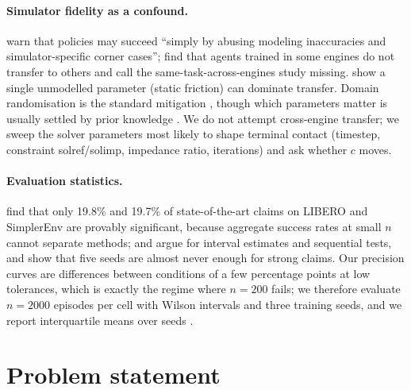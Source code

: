 \documentclass{article}
\begin{document}
\paragraph{Simulator fidelity as a confound.}
\citet{aljalbout2025reality} warn that policies may succeed ``simply by abusing modeling inaccuracies and simulator-specific corner cases''; \citet{kaup2024review} find that agents trained in some engines do not transfer to others and call the same-task-across-engines study missing. \citet{hu2025static} show a single unmodelled parameter (static friction) can dominate transfer. Domain randomisation is the standard mitigation \citep{muratore2022review}, though which parameters matter is usually settled by prior knowledge \citep{kaidanov2024role}. We do not attempt cross-engine transfer; we sweep the solver parameters most likely to shape terminal contact (timestep, constraint solref/solimp, impedance ratio, iterations) and ask whether $c$ moves.

\paragraph{Evaluation statistics.}
\citet{jiang2026benchmarking} find that only 19.8\% and 19.7\% of state-of-the-art claims on LIBERO and SimplerEnv are provably significant, because aggregate success rates at small $n$ cannot separate methods; \citet{kressgazit2024empirical} and \citet{snyder2025step} argue for interval estimates and sequential tests, and \citet{patterson2024empirical} show that five seeds are almost never enough for strong claims. Our precision curves are differences between conditions of a few percentage points at low tolerances, which is exactly the regime where $n{=}200$ fails; we therefore evaluate $n{=}2000$ episodes per cell with Wilson intervals \citep{wilson1927probable} and three training seeds, and we report interquartile means over seeds \citep{agarwal2021deep}.

\section{Problem statement}
\label{sec:problem}
\end{document}
